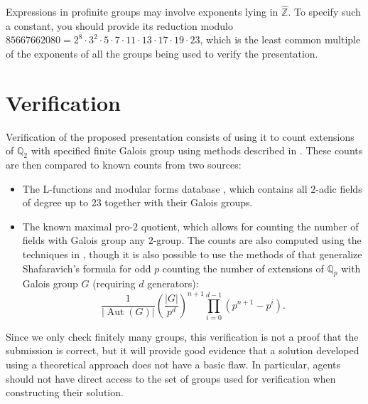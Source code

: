 \documentclass{amsart}
\newcommand{\Q}{\mathbb{Q}}
\newcommand{\Qp}{\mathbb{Q}_p}
\newcommand{\Z}{\mathbb{Z}}
\DeclareMathOperator{\Aut}{Aut}
\begin{document}
Expressions in profinite groups may involve exponents lying in $\hat{\Z}$.  To specify such a constant, you should provide its reduction modulo $85667662080 = 2^{8} \cdot 3^{2} \cdot 5 \cdot 7 \cdot 11 \cdot 13 \cdot 17 \cdot 19 \cdot 23$, which is the least common multiple of the exponents of all the groups being used to verify the presentation.

\section{Verification}

Verification of the proposed presentation consists of using it to count extensions of $\Q_2$ with specified finite Galois group using methods described in \cite{roe:19a}.  These counts are then compared to known counts from two sources:
\begin{itemize}
\item The L-functions and modular forms database \cite{LMFDB}, which contains all $2$-adic fields of degree up to 23 together with their Galois groups.
\item The known maximal pro-$2$ quotient, which allows for counting the number of fields with Galois group any $2$-group.  The counts are also computed using the techniques in \cite{roe:19a}, though it is also possible to use the methods of \cite{yamagishi:95a} that generalize Shafaravich's formula \cite{shafarevich:47a} for odd $p$ counting the number of extensions of $\Qp$ with Galois group $G$ (requiring $d$ generators):
\[
\frac{1}{\lvert \Aut(G) \rvert} \left(\frac{\lvert G \rvert}{p^d}\right)^{n+1} \prod_{i=0}^{d-1} (p^{n+1} - p^i).
\]
\end{itemize}

Since we only check finitely many groups, this verification is not a proof that the submission is correct, but it will provide good evidence that a solution developed using a theoretical approach does not have a basic flaw.  In particular, agents should not have direct access to the set of groups used for verification when constructing their solution.
\end{document}
